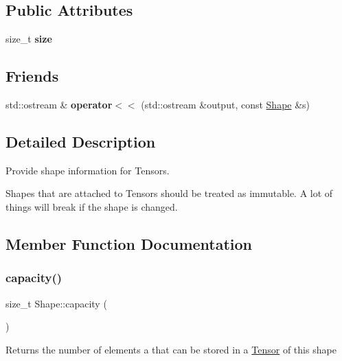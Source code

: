 \subsection*{Public Attributes}
\begin{DoxyCompactItemize}
\item 
\mbox{\label{classShape_a3b0d19e35bdef69d272f1d4d3d0640f2}} 
size\+\_\+t {\bfseries size}
\end{DoxyCompactItemize}
\subsection*{Friends}
\begin{DoxyCompactItemize}
\item 
\mbox{\label{classShape_a7cd20cc8b48ed5c68a5d4d9011e62760}} 
std\+::ostream \& {\bfseries operator$<$$<$} (std\+::ostream \&output, const \hyperlink{classShape}{Shape} \&s)
\end{DoxyCompactItemize}


\subsection{Detailed Description}
Provide shape information for Tensors.

Shapes that are attached to Tensors should be treated as immutable. A lot of things will break if the shape is changed. 

\subsection{Member Function Documentation}
\mbox{\label{classShape_ad6b6d852da0d07a2423e86b4ef5ad546}} 
\subsubsection{\texorpdfstring{capacity()}{capacity()}}
{\footnotesize\ttfamily size\+\_\+t Shape\+::capacity (\begin{DoxyParamCaption}{ }\end{DoxyParamCaption})\hspace{0.3cm}{\ttfamily [inline]}}

Returns the number of elements a that can be stored in a \hyperlink{classTensor}{Tensor} of this shape \mbox{\label{classShape_aac6c0ddc8b96c70e0e138c5ba1e70ec4}} 
